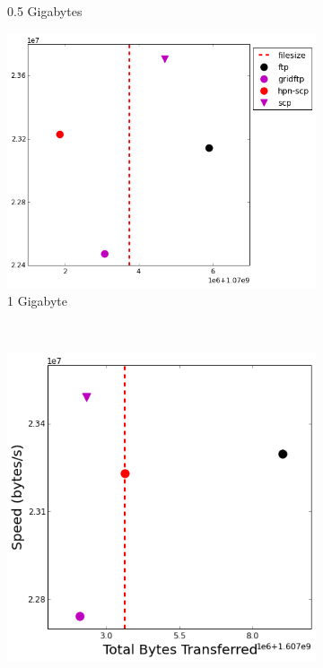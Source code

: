 \documentclass{sig-alternate-05-2015}
\begin{document}
\begin{figure}[t]
\begin{subfigure}{.228\linewidth}
	\caption{0.5 Gigabytes}
	\label{speed_bytes_512M}
	\end{subfigure}
	\begin{subfigure}{.285\linewidth}
	\includegraphics[width=\linewidth]{img/speed_bytes/1G.png}
	\caption{1 Gigabyte}
	\label{speed_bytes_1G}
	\end{subfigure}
	\\
	\begin{subfigure}{.24\linewidth}
	\includegraphics[width=\linewidth]{img/speed_bytes/1_5G.png}

\end{subfigure}
\end{figure}
\end{document}
